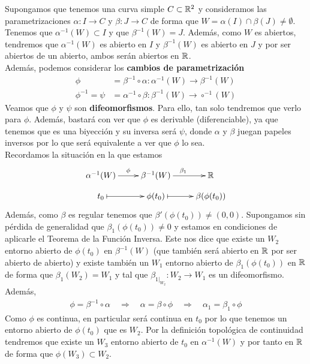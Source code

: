 \begin{ejemplo}
    Supongamos que tenemos una curva simple $C\subset \mathbb{R}^2$ y consideramos las parametrizaciones $\alpha: I \to C$ y $\beta:J \to C$ de forma que $W = \alpha(I)\cap \beta(J)\neq \emptyset$.\\

    Tenemos que $\alpha^{-1}(W)\subset I$ y que $\beta^{-1}(W)=J$. Además, como $W$ es abiertos, tendremos que $\alpha^{-1}(W)$ es abierto en $I$ y $\beta^{-1}(W)$ es abierto en $J$ y por ser abiertos de un abierto, ambos serán abiertos en $\mathbb{R}$.\\

    Además, podemos considerar los \textbf{cambios de parametrización}
    \begin{align*}
        \phi &= \beta^{-1}\circ \alpha : \alpha^{-1}(W) \to \beta^{-1}(W)\\
        \phi^{-1} = \psi &= \alpha^{-1}\circ \beta : \beta^{-1}(W) \to \circ^{-1}(W)
    \end{align*}
    Veamos que $\phi$ y $\psi$ son \textbf{difeomorfismos}. Para ello, tan solo tendremos que verlo para $\phi$. Además, bastará con ver que $\phi$ es derivable (diferenciable), ya que tenemos que es una biyección y su inversa será $\psi$, donde $\alpha$ y $\beta$ juegan papeles inversos por lo que será equivalente a ver que $\phi$ lo sea.\\

    Recordamos la situación en la que estamos
    \begin{gather*}
        \xymatrix@R=3mm{
            \alpha^{-1}(W) \ar[r]^{\phi}  & \beta^{-1}(W) \ar[r]^{\beta_1} & \bb{R} \\
            t_0 \ar@{|->}[r] & \phi(t_0) \ar@{|->}[r] & \beta(\phi(t_0))
        }
    \end{gather*}
    Además, como $\beta$ es regular tenemos que $\beta'(\phi(t_0)) \neq (0,0)$. Supongamos sin pérdida de generalidad que $\beta_1(\phi(t_0)) \neq 0$ y estamos en condiciones de aplicarle el Teorema de la Función Inversa. Este nos dice que existe un $W_2$ entorno abierto de $\phi(t_0)$ en $\beta^{-1}(W)$ (que también será abierto en $\mathbb{R}$ por ser abierto de abierto) y existe también un $W_1$ entorno abierto de $\beta_1(\phi(t_0))$ en $\mathbb{R}$ de forma que $\beta_1(W_2) = W_1$ y tal que $\beta_{1|_{W_2}} : W_2 \to W_1$ es un difeomorfismo. Además,
    \begin{gather*}
        \phi = \beta^{-1}\circ \alpha \quad \Rightarrow \quad \alpha = \beta \circ \phi \quad \Rightarrow \quad \alpha_1 = \beta_1 \circ \phi
    \end{gather*}
    Como $\phi$ es continua, en particular será continua en $t_0$ por lo que tenemos un entorno abierto de $\phi(t_0)$ que es $W_2$. Por la definición topológica de continuidad tendremos que existe un $W_3$ entorno abierto de $t_0$ en $\alpha^{-1}(W)$ y por tanto en $\mathbb{R}$ de forma que $\phi(W_3) \subset W_2$.\\


\end{ejemplo}
